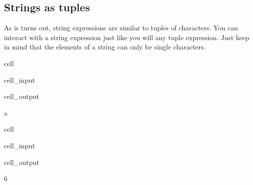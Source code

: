 \documentclass[letterpaper,10pt,english]{jupyterBook}
\begin{document}
\subsection{Strings as tuples}
\label{\detokenize{datatypes:strings-as-tuples}}
\sphinxAtStartPar
As is turns out, string expressions are similar to tuples of characters. You can interact with a string expression just like you will any tuple expression. Just keep in mind that the elements of a string can only be single characters.

\begin{sphinxuseclass}{cell}\begin{sphinxVerbatimInput}

\begin{sphinxuseclass}{cell_input}
\begin{sphinxVerbatim}[commandchars=\\\{\}]
  
\PYG{p}{[}\PYG{p}{]}
\end{sphinxVerbatim}

\end{sphinxuseclass}\end{sphinxVerbatimInput}
\begin{sphinxVerbatimOutput}

\begin{sphinxuseclass}{cell_output}
\begin{sphinxVerbatim}[commandchars=\\\{\}]
\PYGZsq{}a\PYGZsq{}
\end{sphinxVerbatim}

\end{sphinxuseclass}\end{sphinxVerbatimOutput}

\end{sphinxuseclass}
\begin{sphinxuseclass}{cell}\begin{sphinxVerbatimInput}

\begin{sphinxuseclass}{cell_input}
\begin{sphinxVerbatim}[commandchars=\\\{\}]
\end{sphinxVerbatim}

\end{sphinxuseclass}\end{sphinxVerbatimInput}
\begin{sphinxVerbatimOutput}

\begin{sphinxuseclass}{cell_output}
\begin{sphinxVerbatim}[commandchars=\\\{\}]
6
\end{sphinxVerbatim}

\end{sphinxuseclass}\end{sphinxVerbatimOutput}

\end{sphinxuseclass}
\end{document}
